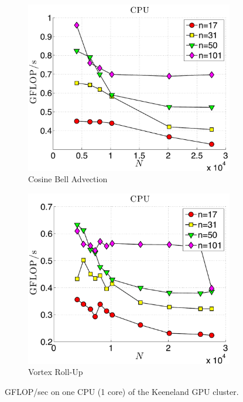 \begin{figure}
\centering
\begin{subfigure}[t]{0.425\textwidth}
\centering
\includegraphics[width=\textwidth]{../figures/keeneland_results/alltoallv_cosine/gflops_cpu_1proc_oneWarpPerStencil.pdf}
\caption{Cosine Bell Advection}
\label{fig:gflops_cpu_1proc_keeneland_cosine}
\end{subfigure} 
\quad
\begin{subfigure}[t]{0.425\textwidth}
\centering
\includegraphics[width=\textwidth]{../figures/keeneland_results/alltoallv_vortex/gflops_cpu_1proc_oneWarpPerStencil.pdf}
\caption{Vortex Roll-Up}
\label{fig:gflops_cpu_1proc_keeneland_vortex}
\end{subfigure}
\caption{GFLOP/sec on one CPU (1 core) of the Keeneland GPU cluster.}
\end{figure}

